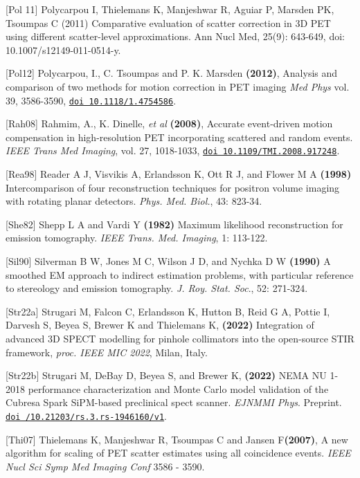 \documentclass{article}
\def\url#1#2{\mbox{\href{#1}{\tt #2}}}
\begin{document}
{{{{{{[Pol 11] Polycarpou I, Thielemans K, Manjeshwar R, Aguiar P, Marsden PK,
Tsoumpas C (2011) Comparative evaluation of scatter correction in 3D PET
using different scatter-level approximations. Ann Nucl Med, 25(9):
643-649, doi: 10.1007/s12149-011-0514-y.

[Pol12] Polycarpou, I., C.
Tsoumpas and P. K. Marsden \textbf{(2012)}, Analysis and
comparison of two methods for motion correction in PET imaging
\textit{Med Phys} vol. 39, 3586-3590, 
\url{http://dx.doi.org/10.1118/1.4754586}{doi 10.1118/1.4754586}.


[Rah08] Rahmim, A., K.
Dinelle, \textit{et al} \textbf{(2008)}, Accurate event-driven motion compensation
in high-resolution PET incorporating scattered and random events. \textit{IEEE Trans
Med Imaging}, vol. 27, 1018-1033, 
\url{http://dx.doi.org/10.1109/TMI.2008.917248}{doi 10.1109/TMI.2008.917248}.

 {[}Rea98] Reader A J, Visvikis A, Erlandsson K, Ott R J, and Flower 
M A \textbf{(1998)} Intercomparison of four reconstruction techniques 
for positron volume imaging with rotating planar detectors. \textit{Phys. 
Med. Biol.}, 43: 823-34.

{[}She82] Shepp L A and Vardi Y \textbf{(1982)} Maximum likelihood reconstruction 
for emission tomography. \textit{IEEE Trans. Med. Imaging}, 1: 113-122.

{[}Sil90] Silverman B W, Jones M C, Wilson J D, and Nychka D W \textbf{(1990)} 
A smoothed EM approach to indirect estimation problems, with 
particular reference to stereology and emission tomography. \textit{J. 
Roy. Stat. Soc}., 52: 271-324. 

[Str22a] Strugari M, Falcon C, Erlandsson K, Hutton B, Reid G A, Pottie I, Darvesh S, Beyea S, Brewer K and Thielemans K, \textbf{(2022)} Integration of advanced 3D SPECT modelling for pinhole collimators into the open-source STIR framework, \textit{proc. IEEE MIC 2022}, Milan, Italy.

[Str22b] Strugari M, DeBay D, Beyea S, and Brewer K, \textbf{(2022)} NEMA NU 1-2018 performance characterization and Monte Carlo model validation 
of the Cubresa Spark SiPM-based preclinical spect scanner. \textit{EJNMMI Phys}. Preprint. \url{https://doi.org/10.21203/rs.3.rs-1946160/v1}{doi /10.21203/rs.3.rs-1946160/v1}.

{[}Thi07{]} Thielemans K, Manjeshwar R, Tsoumpas C and Jansen F\textbf{(2007)}, 
A new algorithm for scaling of PET scatter estimates using all coincidence events. 
\textit { IEEE Nucl Sci Symp Med Imaging Conf } 3586 - 3590.

}}}}}}
\end{document}
